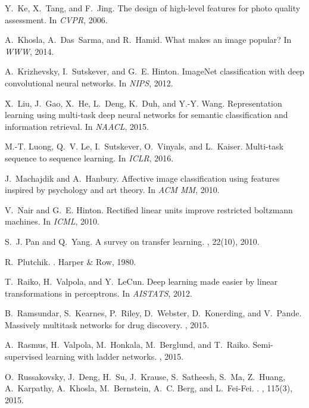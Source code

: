 \documentclass{sig-alternate-05-2015}
\begin{document}
\begin{thebibliography}{10}
Y.~Ke, X.~Tang, and F.~Jing.
\newblock The design of high-level features for photo quality assessment.
\newblock In {\em CVPR}, 2006.

A.~Khosla, A.~Das~Sarma, and R.~Hamid.
\newblock What makes an image popular?
\newblock In {\em WWW}, 2014.

A.~Krizhevsky, I.~Sutskever, and G.~E. Hinton.
\newblock Image{N}et classification with deep convolutional neural networks.
\newblock In {\em NIPS}, 2012.

X.~Liu, J.~Gao, X.~He, L.~Deng, K.~Duh, and Y.-Y. Wang.
\newblock Representation learning using multi-task deep neural networks for
  semantic classification and information retrieval.
\newblock In {\em NAACL}, 2015.

M.-T. Luong, Q.~V. Le, I.~Sutskever, O.~Vinyals, and L.~Kaiser.
\newblock Multi-task sequence to sequence learning.
\newblock In {\em ICLR}, 2016.

J.~Machajdik and A.~Hanbury.
\newblock Affective image classification using features inspired by psychology
  and art theory.
\newblock In {\em ACM MM}, 2010.

V.~Nair and G.~E. Hinton.
\newblock Rectified linear units improve restricted boltzmann machines.
\newblock In {\em ICML}, 2010.

S.~J. Pan and Q.~Yang.
\newblock A survey on transfer learning.
, 22(10), 2010.

R.~Plutchik.
.
\newblock Harper \& Row, 1980.

T.~Raiko, H.~Valpola, and Y.~LeCun.
\newblock Deep learning made easier by linear transformations in perceptrons.
\newblock In {\em AISTATS}, 2012.

B.~Ramsundar, S.~Kearnes, P.~Riley, D.~Webster, D.~Konerding, and V.~Pande.
\newblock Massively multitask networks for drug discovery.
, 2015.

A.~Rasmus, H.~Valpola, M.~Honkala, M.~Berglund, and T.~Raiko.
\newblock Semi-supervised learning with ladder networks.
, 2015.

O.~Russakovsky, J.~Deng, H.~Su, J.~Krause, S.~Satheesh, S.~Ma, Z.~Huang,
  A.~Karpathy, A.~Khosla, M.~Bernstein, A.~C. Berg, and L.~Fei-Fei.
.
, 115(3), 2015.


\end{thebibliography}
\end{document}
